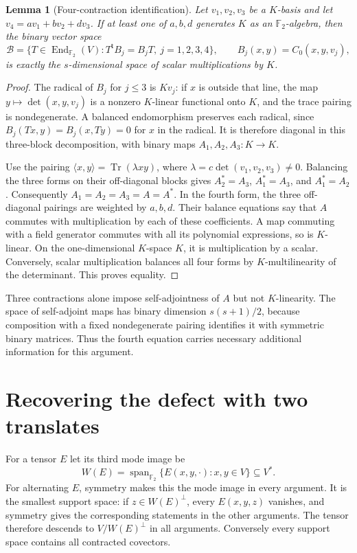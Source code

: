 \documentclass[11pt]{article}
\newtheorem{lemma}[theorem]{Lemma}
\newcommand{\F}{\mathbb F}
\newcommand{\Tr}{\operatorname{Tr}}
\newcommand{\Span}{\operatorname{span}}
\newcommand{\End}{\operatorname{End}}
\begin{document}
\begin{lemma}[Four-contraction identification]\label{lem:four}
Let $v_1,v_2,v_3$ be a $K$-basis and let
$v_4=a v_1+b v_2+d v_3$. If at least one of $a,b,d$ generates $K$ as an
$\F_2$-algebra, then the binary vector space
\[
 \mathcal B=\{T\in\End_{\F_2}(V):T^{\mathsf t}B_j=B_jT,\ j=1,2,3,4\},
 \qquad B_j(x,y)=C_0(x,y,v_j),
\]
is exactly the $s$-dimensional space of scalar multiplications by $K$.
\end{lemma}
\begin{proof}
The radical of $B_j$ for $j\leq3$ is $K v_j$: if $x$ is outside that line,
the map $y\mapsto\det(x,y,v_j)$ is a nonzero $K$-linear functional onto $K$,
and the trace pairing is nondegenerate. A balanced endomorphism preserves
each radical, since $B_j(Tx,y)=B_j(x,Ty)=0$ for $x$ in the radical. It is
therefore diagonal in this three-block decomposition, with binary maps
$A_1,A_2,A_3:K\to K$.

Use the pairing $\langle x,y\rangle=\Tr(\lambda xy)$, where
$\lambda=c\det(v_1,v_2,v_3)\ne0$. Balancing the three forms on their
off-diagonal blocks gives $A_2^*=A_3$, $A_1^*=A_3$, and $A_1^*=A_2$.
Consequently $A_1=A_2=A_3=A=A^*$. In the fourth form, the three
off-diagonal pairings are weighted by $a,b,d$. Their balance equations say
that $A$ commutes with multiplication by each of these coefficients. A map
commuting with a field generator commutes with all its polynomial expressions,
so is $K$-linear. On the one-dimensional $K$-space $K$, it is multiplication
by a scalar. Conversely, scalar multiplication balances all four forms by
$K$-multilinearity of the determinant. This proves equality.
\end{proof}

Three contractions alone impose self-adjointness of $A$ but not $K$-linearity.
The space of self-adjoint maps has binary dimension $s(s+1)/2$, because
composition with a fixed nondegenerate pairing identifies it with symmetric
binary matrices. Thus the fourth equation carries necessary additional information
for this argument.

\section{Recovering the defect with two translates}
For a tensor $E$ let its third mode image be
\[
 W(E)=\Span_{\F_2}\{E(x,y,\cdot):x,y\in V\}\subseteq V^*.
\]
For alternating $E$, symmetry makes this the mode image in every argument.
It is the smallest support space: if $z\in W(E)^\perp$, every $E(x,y,z)$
vanishes, and symmetry gives the corresponding statements in the other
arguments. The tensor therefore descends to $V/W(E)^\perp$ in all arguments.
Conversely every support space contains all contracted covectors.
\end{document}
